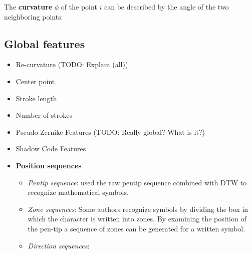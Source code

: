 The \textbf{curvature} $\phi$ of the point $i$ can be described by the
angle of the two neighboring points:


\subsection{Global features}
\begin{itemize}
    \item Re-curvature\cite{Huang06} (TODO: Explain (all))
    \item Center point\cite{Huang06}
    \item Stroke length\cite{Huang06}
    \item Number of strokes\cite{Huang09}
    \item Pseudo-Zernike Features (TODO: Really global? What is it?)\cite{Khotanzad}
    \item Shadow Code Features\cite{Khotanzad}
    \item \textbf{Position sequences}
    \begin{itemize}
        \item \textit{Pentip sequence}: \cite{Kirsch} used the raw pentip
              sequence combined with \gls{DTW} to recognize mathematical symbols.
        \item \textit{Zone sequences}: Some authors \cite{Brown1964,Hanaki80}
          recognize symbols by
          dividing the box in which the character is written into zones. By examining the position of the pen-tip a sequence of zones can be generated for a written
          symbol.
        \item \textit{Direction sequences}:
    \end{itemize}
\end{itemize}